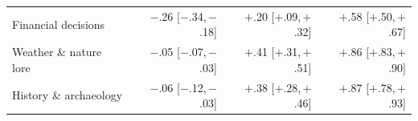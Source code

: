 \begin{table}[h]
\begin{tabular}{l r r r}
Financial decisions & $-$.26 \scriptsize{[$-$.34,\,$-$.18]} & $+$.20 \scriptsize{[$+$.09,\,$+$.32]} & $+$.58 \scriptsize{[$+$.50,\,$+$.67]} \\
Weather \& nature lore & $-$.05 \scriptsize{[$-$.07,\,$-$.03]} & $+$.41 \scriptsize{[$+$.31,\,$+$.51]} & $+$.86 \scriptsize{[$+$.83,\,$+$.90]} \\
History \& archaeology & $-$.06 \scriptsize{[$-$.12,\,$-$.03]} & $+$.38 \scriptsize{[$+$.28,\,$+$.46]} & $+$.87 \scriptsize{[$+$.78,\,$+$.93]} \\
\bottomrule
\end{tabular}
\end{table}
